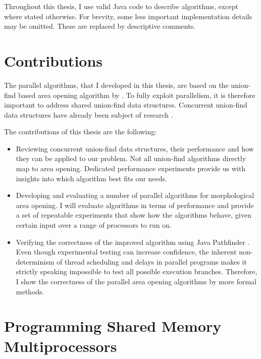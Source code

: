 Throughout this thesis, I use valid Java code to describe algorithms, except
where stated otherwise. For brevity, some less important implementation details
may be omitted. These are replaced by descriptive comments.

\section{Contributions}
\label{sec:introduction-contributions}

The parallel algorithms, that I developed in this thesis, are based on the
union-find based area opening algorithm by \citet{Meijster2002Comparison}. To
fully exploit parallelism, it is therefore important to address shared
union-find data structures. Concurrent union-find data structures have already
been subject of research \cite{Berman2010Multicore, Anderson1994Waitfree}.

The contributions of this thesis are the following:

\begin{itemize}
\item Reviewing concurrent union-find data structures, their performance and how
  they can be applied to our problem. Not all union-find algorithms directly map
  to area opening. Dedicated performance experiments provide us with insights
  into which algorithm best fits our needs.

\item Developing and evaluating a number of parallel algorithms for
  morphological area opening. I will evaluate algorithms in terms of performance
  and provide a set of repeatable experiments that show how the algorithms
  behave, given certain input over a range of processors to run on.

\item Verifying the correctness of the improved algorithm using Java Pathfinder
  \cite{Visser2003Model}. Even though experimental testing can increase
  confidence, the inherent non-determinism of thread scheduling and delays in
  parallel programs makes it strictly speaking impossible to test all possible
  execution branches. Therefore, I show the correctness of the parallel area
  opening algorithms by more formal methods.
\end{itemize}

\section{Programming Shared Memory Multiprocessors}
\label{sec:introduction-concurrency}

